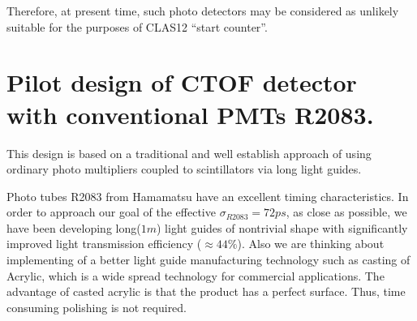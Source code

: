 Therefore, at present time,  such photo detectors may be considered as unlikely 
suitable for the purposes of CLAS12  ``start counter''. 




%
%
%






\newpage

\newpage
\section{Pilot  design of CTOF detector  with conventional PMTs R2083.}
\label{des2083}
This design is based on a traditional and well establish 
 approach of using ordinary  
photo multipliers 
 coupled to scintillators via long light guides.

Photo tubes   R2083 from Hamamatsu have an excellent timing characteristics.
In order to approach our  goal of the effective 
$\sigma_{R2083}=72ps$,
  as close as possible,
  we have been developing long($1m$) light guides of nontrivial  shape 
with significantly improved light transmission efficiency ($\approx44\%$). 
Also we are thinking  about  implementing   of a  better light guide  
manufacturing technology 
such as casting of Acrylic, which is a
wide spread technology for commercial applications. 
The advantage of  
casted acrylic is that the product  has  a perfect surface. Thus, time consuming 
 polishing is not required.
 

